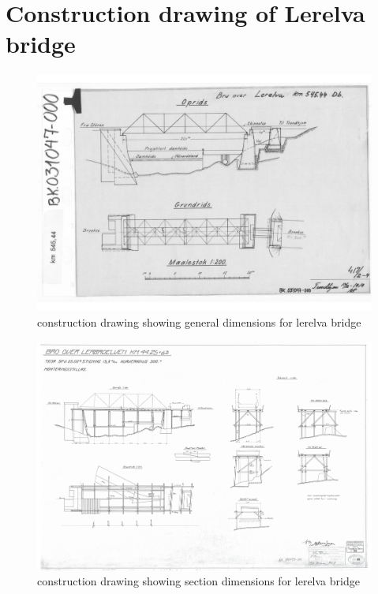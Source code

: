 \chapter{Construction drawing of Lerelva bridge}
\label{lerelva_tegninger}
\begin{figure}
  \begin{adjustbox}{center}
    \includegraphics[width=0.9\pageheight]{../literature/tegninger_Lerelva/tegninger_Lerelva/riss.pdf}
  \end{adjustbox}
  \caption{construction drawing showing general dimensions for lerelva bridge}
  \label{lerelva_construction1}
\end{figure}
\begin{figure}
  \begin{adjustbox}{center}
    \includegraphics[width=0.9\pageheight]{../literature/tegninger_Lerelva/tegninger_Lerelva/sectionSpacings.pdf}
  \end{adjustbox}
  \caption{construction drawing showing section dimensions for lerelva bridge}
  \label{lerelva_construction2}
\end{figure}

